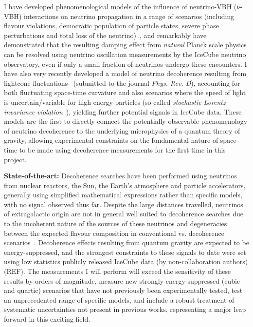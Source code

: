 \documentclass[a4paper,11pt]{article}
\begin{document}
I have developed phenomenological models of the influence of neutrino-VBH ($\nu$-VBH) interactions on neutrino propagation in a range of scenarios (including flavour violations, democratic population of particle states, severe phase perturbations and total loss of the neutrino)~\cite{PhysRevD.102.115003}, and remarkably have demonstrated that the resulting damping effect from \textit{natural} Planck scale physics can be resolved using neutrino oscillation measurements by the IceCube neutrino observatory, even if only a small fraction of neutrinos undergo these encounters. I have also very recently developed a model of neutrino decoherence resulting from lightcone fluctuations~\cite{2103.15313} (submitted to the journal \textit{Phys. Rev. D}), accounting for both fluctuating space-time curvature and also scenarios where the speed of light is uncertain/variable for high energy particles (so-called \textit{stochastic Lorentz invariance violation}~\cite{Vasileiou2015, Amelino-Camelia:2016fuh}), yielding further potential signals in IceCube data. These models are the first to directly connect the potentially observable phenomenology of neutrino decoherence to the underlying microphysics of a quantum theory of gravity, allowing experimental constraints on the fundamental nature of space-time to be made using decoherence measurements for the first time in this project.

\textbf{State-of-the-art:} Decoherence searches have been performed using neutrinos from nuclear reactors, the Sun, the Earth's atmosphere and particle accelerators, generally using simplified mathematical expressions rather than specific models, with no signal observed thus far. Despite the large distances travelled, neutrinos of extragalactic origin are not in general well suited to decoherence searches due to the incoherent nature of the sources of these neutrinos and degeneracies between the expected flavour composition in conventional vs. decoherence scenarios~\cite{PhysRevD.102.115003}. Decoherence effects resulting from quantum gravity are expected to be energy-suppressed, and the strongest constraints to these signals to date were set using low statistics publicly released IceCube data (by non-collaboration authors) (REF). The measurements I will perform will exceed the sensitivity of these results by orders of magnitude, measure new strongly energy-suppressed (cubic and quartic) scenarios that have not previously been experimentally tested, test an unprecedented range of specific models, and include a robust treatment of systematic uncertainties not present in previous works, representing a major leap forward in this exciting field. \\
\end{document}
